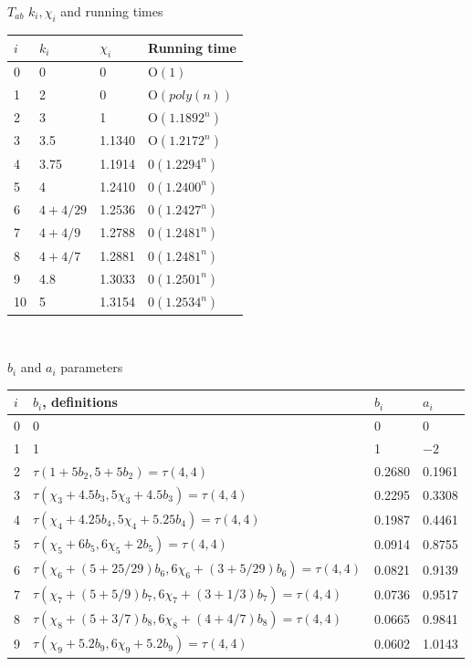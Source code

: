 \documentclass{sigchi}
\begin{document}
\begin{center}
	$T_{a b}$
	$k_{i}, \chi_{i}$ and running times \\
	\begin{tabular}{llll}
		\hline$i$ & $k_{i}$ & $\chi_{i}$ & Running time \\
		\hline 0 & 0 & 0 & $\mathrm{O}(1)$ \\
		1 & 2 & 0 & $\mathrm{O}(p o l y(n))$ \\
		2 & 3 & 1& $\mathrm{O}\left(1.1892^{n}\right)$ \\
		3 & 3.5 &1.1340& $\mathrm{O}\left(1.2172^{n}\right)$ \\
		4 & 3.75&1.1914 & $0\left(1.2294^{n}\right)$ \\
		5 & 4 & 1.2410&$0\left(1.2400^{n}\right)$ \\
		6 & $4+4 / 29$ & 1.2536& $0\left(1.2427^{n}\right)$ \\
		7 & $4+4 / 9$ &1.2788& $0\left(1.2481^{n}\right)$ \\
		8 & $4+4 / 7$ &1.2881& $0\left(1.2481^{n}\right)$ \\
		9 & 4.8 &1.3033& $0\left(1.2501^{n}\right)$ \\
		10 & 5 & 1.3154& $0\left(1.2534^{n}\right)$ \\
		\hline
	\end{tabular}\\
	
\end{center}

\begin{table}
\begin{center}
	$b_{i}$ and $a_{i}$ parameters\\
\end{center}
	\centering
		{
		\begin{tabular}{llll}
			\hline$i$ & $b_{i}$, definitions & $b_{i}$ & $a_{i}$ \\
			\hline 0 & 0 & 0 & 0 \\
			1 & 1 & 1 & $-2$ \\
			2 & $\tau\left(1+5 b_{2}, 5+5 b_{2}\right)=\tau(4,4)$ & 0.2680 & 0.1961 \\
			3 & $\tau\left(\chi_{3}+4.5 b_{3}, 5 \chi_{3}+4.5 b_{3}\right)=\tau(4,4)$ & 0.2295 & 0.3308 \\
			4 & $\tau\left(\chi_{4}+4.25 b_{4}, 5 \chi_{4}+5.25 b_{4}\right)=\tau(4,4)$ & 0.1987 & 0.4461 \\
			5 & $\tau\left(\chi_{5}+6 b_{5}, 6 \chi_{5}+2 b_{5}\right)=\tau(4,4)$ & 0.0914 & 0.8755 \\
			6 & $\tau\left(\chi_{6}+(5+25 / 29) b_{6}, 6 \chi_{6}+(3+5 / 29) b_{6}\right)=\tau(4,4)$ & 0.0821 & 0.9139 \\
			7 & $\tau\left(\chi_{7}+(5+5 / 9) b_{7}, 6 \chi_{7}+(3+1 / 3) b_{7}\right)=\tau(4,4)$ & 0.0736 & 0.9517 \\
			8 & $\tau\left(\chi_{8}+(5+3 / 7) b_{8}, 6 \chi_{8}+(4+4 / 7) b_{8}\right)=\tau(4,4)$ & 0.0665 & 0.9841 \\
			9 & $\tau\left(\chi_{9}+5.2 b_{9}, 6 \chi_{9}+5.2 b_{9}\right)=\tau(4,4)$ & 0.0602 & 1.0143 \\
			\hline
	\end{tabular}}
\end{table}
\end{document}
